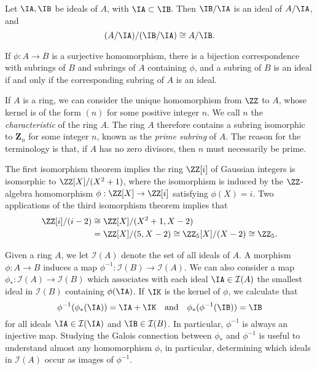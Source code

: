 \begin{theorem}
    Let $\IA, \IB$ be ideals of $A$, with $\IA \subset \IB$. Then $\IB/\IA$ is an ideal of $A/\IA$, and
    \[ (A/\IA)/(\IB/\IA) \cong A/\IB. \]
\end{theorem}

\begin{theorem}
    If $\phi:A \to B$ is a surjective homomorphism, there is a bijection correspondence with subrings of $B$ and subrings of $A$ containing $\phi$, and a subring of $B$ is an ideal if and only if the corresponding subring of $A$ is an ideal.
\end{theorem}

\begin{example}
    If $A$ is a ring, we can consider the unique homomorphism from $\ZZ$ to $A$, whose kernel is of the form $(n)$ for some positive integer $n$. We call $n$ the \emph{characteristic} of the ring $A$. The ring $A$ therefore contains a subring isomorphic to $\mathbf{Z}_n$ for some integer $n$, known as the \emph{prime subring} of $A$. The reason for the terminology is that, if $A$ has no zero divisors, then $n$ must necessarily be prime.
\end{example}

\begin{example}
    The first isomorphism theorem implies the ring $\ZZ[i]$ of Gaussian integers is isomorphic to $\ZZ[X] / (X^2 + 1)$, where the isomorphism is induced by the $\ZZ$-algebra homomorphism $\phi: \ZZ[X] \to \ZZ[i]$ satisfying $\phi(X) = i$. Two applications of the third isomorphism theorem implies that
    \begin{align*}
        \ZZ[i]/(i-2) &\cong \ZZ[X]/(X^2 + 1, X - 2)\\
        &= \ZZ[X]/(5, X - 2) \cong \ZZ_5[X]/(X - 2) \cong \ZZ_5.
    \end{align*}
\end{example}

Given a ring $A$, we let $\mathcal{I}(A)$ denote the set of all ideals of $A$. A morphism $\phi: A \to B$ induces a map $\phi^{-1}: \mathcal{I}(B) \to \mathcal{I}(A)$. We can also consider a map $\phi_*: \mathcal{I}(A) \to \mathcal{I}(B)$ which associates with each ideal $\IA \in \mathcal{I}(A)$ the smallest ideal in $\mathcal{I}(B)$ containing $\phi(\IA)$. If $\IK$ is the kernel of $\phi$, we calculate that
%
\[ \phi^{-1}(\phi_*(\IA)) = \IA + \IK \quad\text{and}\quad \phi_*(\phi^{-1}(\IB)) = \IB  \]
%
for all ideals $\IA \in \mathcal{I}(\IA)$ and $\IB \in \mathcal{I}(B)$. In particular, $\phi^{-1}$ is always an injective map. Studying the Galois connection between $\phi_*$ and $\phi^{-1}$ is useful to understand almost any homomorphism $\phi$, in particular, determining which ideals in $\mathcal{I}(A)$ occur as images of $\phi^{-1}$.


